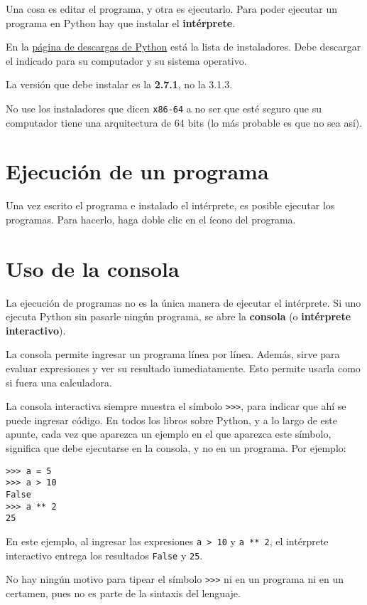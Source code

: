 Una cosa es editar el programa, y otra es ejecutarlo. Para poder
ejecutar un programa en Python hay que instalar el \textbf{intérprete}.

En la \href{http://www.python.org/download/}{página de descargas de
Python} está la lista de instaladores. Debe descargar el indicado para
su computador y su sistema operativo.

La versión que debe instalar es la \textbf{2.7.1}, no la 3.1.3.

No use los instaladores que dicen \lstinline!x86-64! a no ser que esté
seguro que su computador tiene una arquitectura de 64 bits (lo más
probable es que no sea así).

\section{Ejecución de un programa}

Una vez escrito el programa e instalado el intérprete, es posible
ejecutar los programas. Para hacerlo, haga doble clic en el ícono del
programa.

\section{Uso de la consola}

La ejecución de programas no es la única manera de ejecutar el
intérprete. Si uno ejecuta Python sin pasarle ningún programa, se abre
la \textbf{consola} (o \textbf{intérprete interactivo}).

La consola permite ingresar un programa línea por línea. Además, sirve
para evaluar expresiones y ver su resultado inmediatamente. Esto permite
usarla como si fuera una calculadora.

La consola interactiva siempre muestra el símbolo \lstinline!>>>!, para
indicar que ahí se puede ingresar código. En todos los libros sobre
Python, y a lo largo de este apunte, cada vez que aparezca un ejemplo en
el que aparezca este símbolo, significa que debe ejecutarse en la
consola, y no en un programa. Por ejemplo:

\begin{lstlisting}
>>> a = 5
>>> a > 10
False
>>> a ** 2
25
\end{lstlisting}

En este ejemplo, al ingresar las expresiones \lstinline!a > 10! y
\lstinline!a ** 2!, el intérprete interactivo entrega los resultados
\lstinline!False! y \lstinline!25!.

No hay ningún motivo para tipear el símbolo \lstinline!>>>! ni en un
programa ni en un certamen, pues no es parte de la sintaxis del
lenguaje.

